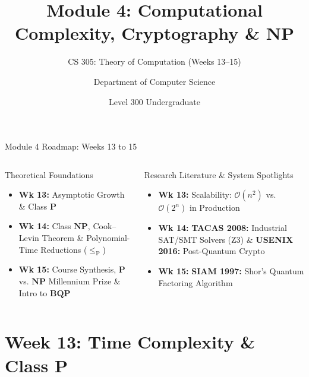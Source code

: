 \documentclass[aspectratio=169,10pt]{beamer}
\title[CS 305 $|$ Module 4]{Module 4: Computational Complexity, Cryptography \& NP}
\subtitle{CS 305: Theory of Computation (Weeks 13--15)}
\author[GIMPA School of Technology]{Department of Computer Science}
\institute[GIMPA]{Ghana Institute of Management and Public Administration (GIMPA)}
\date{Level 300 Undergraduate}
\begin{document}
\begin{frame}
    \titlepage
\end{frame}

\begin{frame}{Module 4 Roadmap: Weeks 13 to 15}
    \begin{columns}[T]
        \begin{block}{Theoretical Foundations}
            \begin{itemize}\setlength{\itemsep}{3pt}
                \item \textbf{Wk 13:} Asymptotic Growth \& Class $\mathbf{P}$
                \item \textbf{Wk 14:} Class $\mathbf{NP}$, Cook--Levin Theorem \& Polynomial-Time Reductions ($\le_{\text{P}}$)
                \item \textbf{Wk 15:} Course Synthesis, $\mathbf{P}$ vs. $\mathbf{NP}$ Millennium Prize \& Intro to $\mathbf{BQP}$
            \end{itemize}
        \end{block}
        
        \begin{alertblock}{Research Literature \& System Spotlights}
            \begin{itemize}\setlength{\itemsep}{3pt}
                \item \textbf{Wk 13:} Scalability: $\mathcal{O}(n^2)$ vs. $\mathcal{O}(2^n)$ in Production
                \item \textbf{Wk 14:} \textbf{TACAS 2008:} Industrial SAT/SMT Solvers (Z3) \& \textbf{USENIX 2016:} Post-Quantum Crypto
                \item \textbf{Wk 15:} \textbf{SIAM 1997:} Shor's Quantum Factoring Algorithm
            \end{itemize}
        \end{alertblock}
    \end{columns}
\end{frame}

\section{Week 13: Time Complexity \& Class P}
\end{document}
